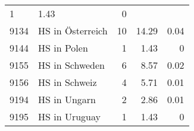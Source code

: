 \begin{longtable}{lXrrr}
       \num{1} &
       \num[round-mode=places,round-precision=2]{1.43} &
         \num[round-mode=places,round-precision=2]{0} \\

     9134 &
     \multicolumn{1}{X}{ HS in Österreich   } &


       \num{10} &
       \num[round-mode=places,round-precision=2]{14.29} &
         \num[round-mode=places,round-precision=2]{0.04} \\

     9144 &
     \multicolumn{1}{X}{ HS in Polen   } &


       \num{1} &
       \num[round-mode=places,round-precision=2]{1.43} &
         \num[round-mode=places,round-precision=2]{0} \\

     9155 &
     \multicolumn{1}{X}{ HS in Schweden   } &


       \num{6} &
       \num[round-mode=places,round-precision=2]{8.57} &
         \num[round-mode=places,round-precision=2]{0.02} \\

     9156 &
     \multicolumn{1}{X}{ HS in Schweiz   } &


       \num{4} &
       \num[round-mode=places,round-precision=2]{5.71} &
         \num[round-mode=places,round-precision=2]{0.01} \\

     9194 &
     \multicolumn{1}{X}{ HS in Ungarn   } &


       \num{2} &
       \num[round-mode=places,round-precision=2]{2.86} &
         \num[round-mode=places,round-precision=2]{0.01} \\

     9195 &
     \multicolumn{1}{X}{ HS in Uruguay   } &


       \num{1} &
       \num[round-mode=places,round-precision=2]{1.43} &
         \num[round-mode=places,round-precision=2]{0} \\


\end{longtable}
